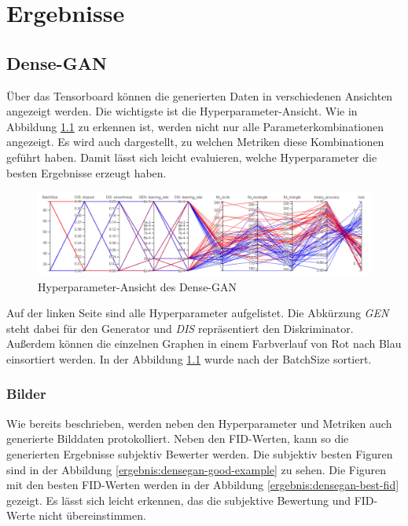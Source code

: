 
\chapter{Ergebnisse}

\section{Dense-GAN}
Über das Tensorboard können die generierten Daten in verschiedenen Ansichten angezeigt werden.
Die wichtigste ist die Hyperparameter-Ansicht.
Wie in Abbildung \ref{ergebnis:densegan-hyper} zu erkennen ist, werden nicht nur alle Parameterkombinationen angezeigt.
Es wird auch dargestellt, zu welchen Metriken diese Kombinationen geführt haben.
Damit lässt sich leicht evaluieren, welche Hyperparameter die besten Ergebnisse erzeugt haben.

\begin{figure}[H]
	\centering
	\includegraphics[width=0.75\textheight]{kapitel/5_ergebnisse/densegan/hyperparameter.PNG}
	\caption{Hyperparameter-Ansicht des Dense-GAN}
	\label{ergebnis:densegan-hyper}
\end{figure}

Auf der linken Seite sind alle Hyperparameter aufgelistet.
Die Abkürzung \textit{GEN} steht dabei für den Generator und \textit{DIS} repräsentiert den Diskriminator.
Außerdem können die einzelnen Graphen in einem Farbverlauf von Rot nach Blau einsortiert werden.
In der Abbildung \ref{ergebnis:densegan-hyper} wurde nach der BatchSize sortiert.

\subsection{Bilder}
Wie bereits beschrieben, werden neben den Hyperparameter und Metriken auch generierte Bilddaten protokolliert.
Neben den FID-Werten, kann so die generierten Ergebnisse subjektiv Bewerter werden.
Die subjektiv besten Figuren sind in der Abbildung \ref{ergebnis:densegan-good-example} zu sehen.
Die Figuren mit den besten FID-Werten werden in der Abbildung  \ref{ergebnis:densegan-best-fid} gezeigt.
Es lässt sich leicht erkennen, das die subjektive Bewertung und FID-Werte nicht übereinstimmen.

